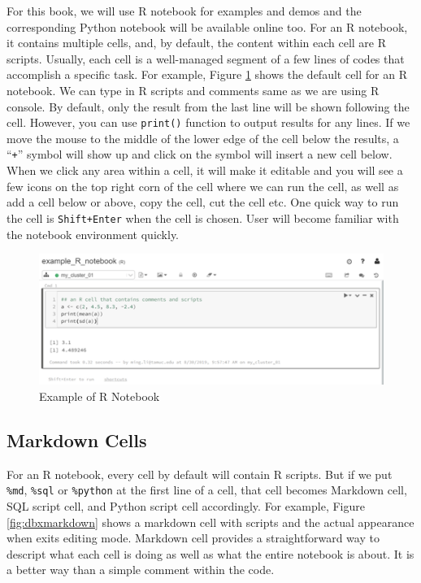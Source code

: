 \documentclass[12pt,]{krantz}
\begin{document}
For this book, we will use R notebook for examples and demos and the corresponding Python notebook will be available online too. For an R notebook, it contains multiple cells, and, by default, the content within each cell are R scripts. Usually, each cell is a well-managed segment of a few lines of codes that accomplish a specific task. For example, Figure \ref{fig:rnotebook} shows the default cell for an R notebook. We can type in R scripts and comments same as we are using R console. By default, only the result from the last line will be shown following the cell. However, you can use \texttt{print()} function to output results for any lines. If we move the mouse to the middle of the lower edge of the cell below the results, a ``\texttt{+}'' symbol will show up and click on the symbol will insert a new cell below. When we click any area within a cell, it will make it editable and you will see a few icons on the top right corn of the cell where we can run the cell, as well as add a cell below or above, copy the cell, cut the cell etc. One quick way to run the cell is \texttt{Shift+Enter} when the cell is chosen. User will become familiar with the notebook environment quickly.

\begin{figure}

{\centering \includegraphics[width=0.8\linewidth]{images/dbxrnotebook} 

}

\caption{Example of R Notebook}\label{fig:rnotebook}
\end{figure}

\hypertarget{markdown-cells}{%
\subsection{Markdown Cells}\label{markdown-cells}}

For an R notebook, every cell by default will contain R scripts. But if we put \texttt{\%md}, \texttt{\%sql} or \texttt{\%python} at the first line of a cell, that cell becomes Markdown cell, SQL script cell, and Python script cell accordingly. For example, Figure \ref{fig:dbxmarkdown} shows a markdown cell with scripts and the actual appearance when exits editing mode. Markdown cell provides a straightforward way to descript what each cell is doing as well as what the entire notebook is about. It is a better way than a simple comment within the code.
\end{document}
